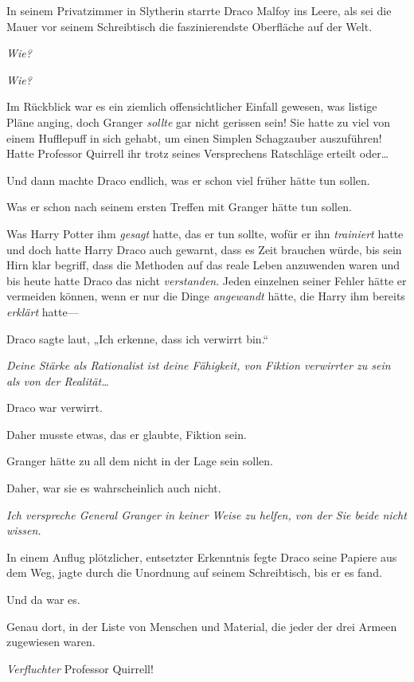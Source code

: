 {\later

In seinem Privatzimmer in Slytherin starrte Draco Malfoy ins Leere, als sei die Mauer vor seinem Schreibtisch die faszinierendste Oberfläche auf der Welt.

\emph{Wie?}

\emph{Wie?}

Im Rückblick war es ein ziemlich offensichtlicher Einfall gewesen, was listige Pläne anging, doch Granger \emph{sollte} gar nicht gerissen sein! Sie hatte zu viel von einem Hufflepuff in sich gehabt, um einen Simplen Schagzauber auszuführen! Hatte Professor Quirrell ihr trotz seines Versprechens Ratschläge erteilt oder…

Und dann machte Draco endlich, was er schon viel früher hätte tun sollen.

Was er schon nach seinem ersten Treffen mit Granger hätte tun sollen.

Was Harry Potter ihm \emph{gesagt} hatte, das er tun sollte, wofür er ihn \emph{trainiert} hatte und doch hatte Harry Draco auch gewarnt, dass es Zeit brauchen würde, bis sein Hirn klar begriff, dass die Methoden auf das reale Leben anzuwenden waren und bis heute hatte Draco das nicht \emph{verstanden}. Jeden einzelnen seiner Fehler hätte er vermeiden können, wenn er nur die Dinge \emph{angewandt} hätte, die Harry ihm bereits \emph{erklärt} hatte—

Draco sagte laut, „Ich erkenne, dass ich verwirrt bin.“

\emph{Deine Stärke als Rationalist ist deine Fähigkeit, von Fiktion verwirrter zu sein als von der Realität…}

Draco war verwirrt.

Daher musste etwas, das er glaubte, Fiktion sein.

Granger hätte zu all dem nicht in der Lage sein sollen.

Daher, war sie es wahrscheinlich auch nicht.

\emph{Ich verspreche General Granger in keiner Weise zu helfen, von der Sie beide nicht wissen.}

In einem Anflug plötzlicher, entsetzter Erkenntnis fegte Draco seine Papiere aus dem Weg, jagte durch die Unordnung auf seinem Schreibtisch, bis er es fand.

Und da war es.

Genau dort, in der Liste von Menschen und Material, die jeder der drei Armeen zugewiesen waren.

\emph{Verfluchter} Professor Quirrell!

}
